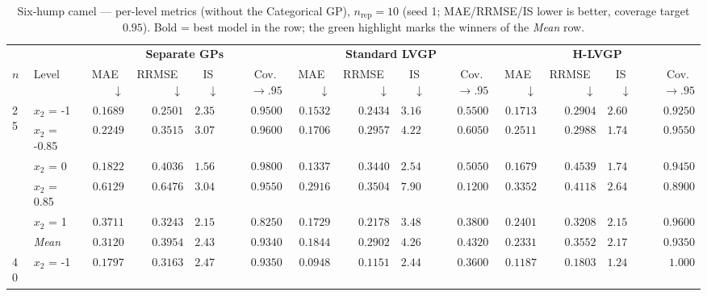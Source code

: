 \begin{table}[htbp]
\centering
\scriptsize
\setlength{\tabcolsep}{2.5pt}
\setlength{\fboxsep}{1pt}
\caption{Six-hump camel --- per-level metrics (without the Categorical GP), $n_{\mathrm{rep}}=10$ (seed 1; MAE/RRMSE/IS lower is better, coverage target $0.95$). Bold = best model in the row; the green highlight marks the winners of the \emph{Mean} row.}
\label{tab:sixhump_camel_nrep10_nocat}
\begin{tabular}{llrrrrrrrrrrrr}
\toprule
 & & \multicolumn{4}{c}{\textbf{Separate GPs}} & \multicolumn{4}{c}{\textbf{Standard LVGP}} & \multicolumn{4}{c}{\textbf{H-LVGP}} \\
\cmidrule(lr){3-6} \cmidrule(lr){7-10} \cmidrule(lr){11-14}
$n$ & Level & MAE~$\downarrow$ & RRMSE~$\downarrow$ & IS~$\downarrow$ & Cov.~$\to.95$ & MAE~$\downarrow$ & RRMSE~$\downarrow$ & IS~$\downarrow$ & Cov.~$\to.95$ & MAE~$\downarrow$ & RRMSE~$\downarrow$ & IS~$\downarrow$ & Cov.~$\to.95$ \\
\midrule
\multirow{6}{*}{25} & $x_2$ = -1 & $0.1689$ & $0.2501$ & {\boldmath$2.355$} & {\boldmath$0.9500$} & {\boldmath$0.1532$} & {\boldmath$0.2434$} & $3.163$ & $0.5500$ & $0.1713$ & $0.2904$ & $2.601$ & $0.9250$ \\
 & $x_2$ = -0.85 & $0.2249$ & $0.3515$ & $3.078$ & $0.9600$ & {\boldmath$0.1706$} & {\boldmath$0.2957$} & $4.223$ & $0.6050$ & $0.2511$ & $0.2988$ & {\boldmath$1.745$} & {\boldmath$0.9550$} \\
 & $x_2$ = 0 & $0.1822$ & $0.4036$ & {\boldmath$1.563$} & $0.9800$ & {\boldmath$0.1337$} & {\boldmath$0.3440$} & $2.544$ & $0.5050$ & $0.1679$ & $0.4539$ & $1.749$ & {\boldmath$0.9450$} \\
 & $x_2$ = 0.85 & $0.6129$ & $0.6476$ & $3.049$ & {\boldmath$0.9550$} & {\boldmath$0.2916$} & {\boldmath$0.3504$} & $7.908$ & $0.1200$ & $0.3352$ & $0.4118$ & {\boldmath$2.640$} & $0.8900$ \\
 & $x_2$ = 1 & $0.3711$ & $0.3243$ & {\boldmath$2.151$} & $0.8250$ & {\boldmath$0.1729$} & {\boldmath$0.2178$} & $3.481$ & $0.3800$ & $0.2401$ & $0.3208$ & $2.156$ & {\boldmath$0.9600$} \\
 & \textit{Mean} & $0.3120$ & $0.3954$ & $2.439$ & $0.9340$ & \colorbox{green!20}{\boldmath$0.1844$} & \colorbox{green!20}{\boldmath$0.2902$} & $4.264$ & $0.4320$ & $0.2331$ & $0.3552$ & \colorbox{green!20}{\boldmath$2.178$} & \colorbox{green!20}{\boldmath$0.9350$} \\
\midrule
\multirow{6}{*}{40} & $x_2$ = -1 & $0.1797$ & $0.3163$ & $2.472$ & {\boldmath$0.9350$} & {\boldmath$0.0948$} & {\boldmath$0.1151$} & $2.447$ & $0.3600$ & $0.1187$ & $0.1803$ & {\boldmath$1.245$} & $1.000$ \\

\end{tabular}
\end{table}
